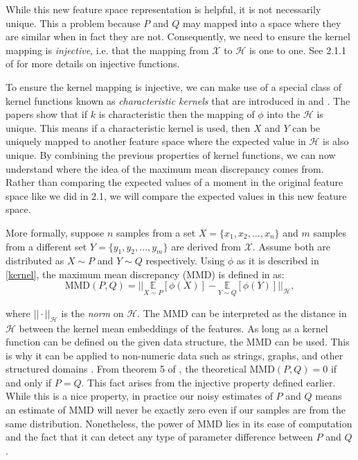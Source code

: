
While this new feature space representation is helpful, it is not necessarily unique. This a problem because $P$ and $Q$ may mapped into a space where they are similar when in fact they are not. Consequently, we need to ensure the kernel mapping is \textit{injective}, i.e. that the mapping from $\mathcal{X}$ to  $\mathcal{H}$ is one to one. See 2.1.1 of \cite{atkinson2005theoretical} for more details on injective functions.

To ensure the kernel mapping is injective, we can make use of a special class of kernel functions known as \textit{characteristic kernels} that are introduced in \cite{fukumizu2008kernel} and \cite{sriperumbudur2011universality}. The papers show that if $k$ is characteristic then the mapping of $\phi$ into the $\mathcal{H}$ is unique. This means if a characteristic kernel is used, then $X$ and $Y$ can be uniquely mapped to another feature space where the expected value in $\mathcal{H}$ is also unique.  By combining the previous properties of kernel functions, we can now understand where the idea of the maximum mean discrepancy comes from. Rather than comparing the expected values of a moment in the original feature space like we did in 2.1, we will compare the expected values in this new feature space.

More formally, suppose $n$ samples from a set $X = \{x_1, x_2, ..., x_n\}$ and $m$ samples from a different set $Y=\{y_1, y_2, ..., y_m\}$ are derived from $\mathcal{X}$. Assume both are distributed as $X \sim  P$ and $Y \sim Q$ respectively. Using $\phi$ as it is described in \ref{kernel}, the maximum mean discrepancy (MMD) is defined in \cite{smola2007hilbert} as:
\begin{equation}
\label{mmd_theory}
\text{MMD}(P,Q)=|| \underset{X \sim P}{\mathbb{E}}[\phi(X)] -  \underset{Y \sim Q}{\mathbb{E}}[\phi(Y)]||_\mathcal{H},
\end{equation}

where $||\cdot||_\mathcal{H}$ is the \textit{norm} on $\mathcal{H}$. The MMD can be interpreted as the distance in $\mathcal{H}$ between the kernel mean embeddings of the features. As long as a kernel function can be defined on the given data structure, the MMD can be used. This is why it can be applied to non-numeric data such as strings, graphs, and other structured domains \cite{hofmann2008kernel}. From theorem 5 of \cite{gretton2012kernel}, the theoretical MMD$(P,Q) = 0$ if and only if $P=Q$. This fact arises from the injective property defined earlier. While this is a nice property, in practice our noisy estimates of $P$ and $Q$ means an estimate of MMD will never be exactly zero even if our samples are from the same distribution. Nonetheless, the power of MMD lies in its ease of computation and the fact that it can detect any type of parameter difference between $P$ and $Q$. 

